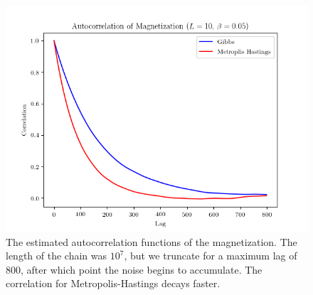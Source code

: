 \documentclass[11pt,a4paper]{amsart}
\begin{document}
\begin{figure}[H]
\centering
\includegraphics[width=5in]{gibbsMHACF.png}
\caption{The estimated autocorrelation functions of the magnetization.  The length of the chain was $10^7$, but we truncate for a maximum lag of 800, after which point the noise begins to accumulate.  The correlation for Metropolis-Hastings decays faster.}
\label{fig:gibbsMHACF}
\end{figure}



\end{document}
